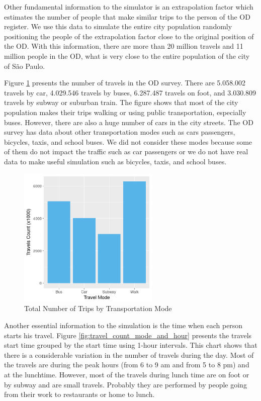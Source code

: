 Other fundamental information to the simulator is an extrapolation factor which estimates the number of people that make similar trips to the person of the OD register. We use this data to simulate the entire city population randomly positioning the people of the extrapolation factor close to the original position of the OD. With this information, there are more than 20 million travels and 11 million people in the OD, what is very close to the entire population of the city of S\~ao Paulo. 

Figure \ref{fig:travel_count_mode} presents the number of travels in the OD survey. There are 5.058.002 travels by car, 4.029.546 travels by buses, 6.287.487 travels on foot, and 3.030.809 travels by subway or suburban train. The figure shows that most of the city population makes their trips walking or using public transportation, especially buses. However, there are also a huge number of cars in the city streets. The OD survey has data about other transportation modes such as cars passengers, bicycles, taxis, and school buses. We did not consider these modes because some of them do not impact the traffic such as car passengers or we do not have real data to make useful simulation such as bicycles, taxis, and school buses.

\begin{figure}[!htb]
\centering
\includegraphics[width=0.6\textwidth]{figuras/chap-sp/travel_count.png}
\caption{Total Number of Trips by Transportation Mode}
\label{fig:travel_count_mode}
\end{figure}

Another essential information to the simulation is the time when each person starts his travel. Figure \ref{fig:travel_count_mode_and_hour} presents the travels start time grouped by the start time using 1-hour intervals. This chart shows that there is a considerable variation in the number of travels during the day. Most of the travels are during the peak hours (from 6 to 9 am and from 5 to 8 pm) and at the lunchtime. However, most of the travels during lunch time are on foot or by subway and are small travels. Probably they are performed by people going from their work to restaurants or home to lunch.

